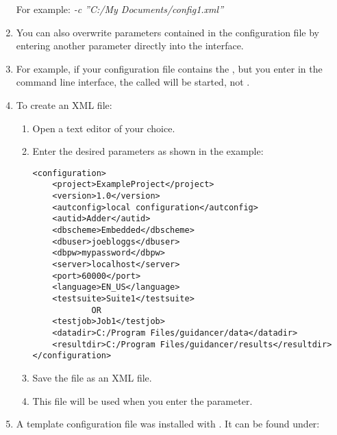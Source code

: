 \begin{enumerate}
For example:
\emph{-c ''C:/My Documents/config1.xml''}
\item You can also overwrite parameters contained in the configuration file by entering another parameter directly into the interface. 
\item For example, if your configuration file contains the \gdsuite{} , but you enter  in the command line interface, the \gdsuite{} called  will be started, not .
\item To create an XML file:
\begin{enumerate} 
\item Open a text editor of your choice. 
\item Enter the desired parameters as shown in the example:
\footnotesize
\begin{verbatim}
<configuration>
    <project>ExampleProject</project>
    <version>1.0</version>
    <autconfig>local configuration</autconfig>
    <autid>Adder</autid>
    <dbscheme>Embedded</dbscheme>
    <dbuser>joebloggs</dbuser>
    <dbpw>mypassword</dbpw>
    <server>localhost</server>
    <port>60000</port>
    <language>EN_US</language>
    <testsuite>Suite1</testsuite>
            OR
    <testjob>Job1</testjob>        
    <datadir>C:/Program Files/guidancer/data</datadir>
    <resultdir>C:/Program Files/guidancer/results</resultdir>
</configuration>
\end{verbatim}
\normalsize
\item Save the file as an XML file.
\item This file will be used when you enter the  parameter.
\end{enumerate}
\item A template configuration file was installed with \jb{}. It can be found under:\\
\end{enumerate}
